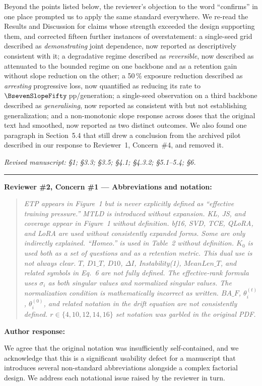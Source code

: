 \documentclass[11pt,a4paper]{article}
\newcommand{\rconcern}[3]{%
  \bigskip\noindent\rule{\linewidth}{0.4pt}\par\medskip
  \noindent\textbf{\textcolor{rccolor}{#1 --- #2:}}\par
  \smallskip
  \begin{quote}\itshape\textcolor{rccolor}{#3}\end{quote}%
}
\newcommand{\arhead}[1]{\medskip\noindent\textbf{#1}\par\smallskip}
\newcommand{\msloc}[1]{%
  \smallskip\noindent\textit{Revised manuscript: #1}\par%
}
\begin{document}
Beyond the points listed below, the reviewer's objection to the word
``confirms'' in one place prompted us to apply the same standard
everywhere. We re-read the Results and Discussion for claims whose
strength exceeded the design supporting them, and corrected fifteen
further instances of overstatement: a single-seed grid described as \emph{demonstrating}
joint dependence, now reported as descriptively consistent with it; a
degradative regime described as \emph{reversible}, now described as
attenuated to the bounded regime on one backbone and as a retention gain
without slope reduction on the other; a 50\,\% exposure reduction
described as \emph{arresting} progressive loss, now quantified as
reducing its rate to $\BsevenSlopeFifty$\,pp/generation; a single-seed
observation on a third backbone described as \emph{generalising}, now
reported as consistent with but not establishing generalization; and a
non-monotonic slope response across doses that the original text had
smoothed, now reported as two distinct outcomes. We also found one
paragraph in Section~5.4 that still drew a conclusion from the archived
pilot described in our response to Reviewer~1, Concern~\#4, and removed
it.

\msloc{\S1; \S3.3; \S3.5; \S4.1; \S4.3.2;
\S5.1--5.4; \S6.}


\rconcern{Reviewer \#2, Concern \#1}{Abbreviations and notation}{ETP appears in Figure~1 but is never explicitly defined as ``effective training pressure.'' MTLD is introduced without expansion. KL, JS, and coverage appear in Figure~1 without definition. bf16, SVD, TCE, QLoRA, and LoRA are used without consistently expanded forms. Some are only indirectly explained. ``Homeo.'' is used in Table~2 without definition. $K_0$ is used both as a set of questions and as a retention metric. This dual use is not always clear. $T$, $D1\_T$, $D10$, $\Delta I$, Instability(1), $MeanLen\_T$, and related symbols in Eq.~6 are not fully defined. The effective-rank formula uses $\sigma_i$ as both singular values and normalized singular values. The normalization condition is mathematically incorrect as written. $BA\_F$, $\theta_i^{(t)}$, $\theta_i^{(0)}$, and related notation in the drift equation are not consistently defined. $r \in \{4,10,12,14,16\}$ set notation was garbled in the original PDF.}

\arhead{Author response:}

We agree that the original notation was insufficiently self-contained,
and we acknowledge that this is a significant usability defect for a
manuscript that introduces several non-standard abbreviations alongside
a complex factorial design. We address each notational issue raised by
the reviewer in turn.
\end{document}
